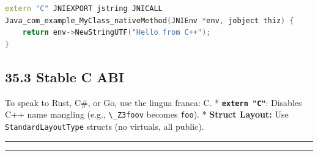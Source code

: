 \begin{lstlisting}[language={C++}]
extern "C" JNIEXPORT jstring JNICALL
Java_com_example_MyClass_nativeMethod(JNIEnv *env, jobject thiz) {
    return env->NewStringUTF("Hello from C++");
}
\end{lstlisting}

\hypertarget{stable-c-abi}{%
\subsection{35.3 Stable C ABI}\label{stable-c-abi}}

To speak to Rust, C\#, or Go, use the lingua franca: C. *
\textbf{\passthrough{\lstinline!extern "C"!}}: Disables C++ name
mangling (e.g., \passthrough{\lstinline!\_Z3foov!} becomes
\passthrough{\lstinline!foo!}). * \textbf{Struct Layout:} Use
\passthrough{\lstinline!StandardLayoutType!} structs (no virtuals, all
public).

\begin{center}\rule{0.5\linewidth}{0.5pt}\end{center}

\begin{center}\rule{0.5\linewidth}{0.5pt}\end{center}
